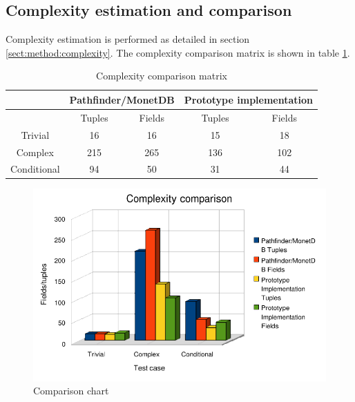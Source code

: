 \newpage
\subsection{Complexity estimation and comparison}
Complexity estimation is performed as detailed in section
\ref{sect:method:complexity}. The complexity
comparison matrix is shown in table \ref{table:result:complexity_matrix}.

\begin{table}[!htp]
 \begin{tabular}{| c | c | c || c | c |}
  \hline
   & \multicolumn{2}{|c||}{\textbf{Pathfinder/MonetDB}}
   & \multicolumn{2}{|c|}{\textbf{Prototype implementation}} \\
   \hline
   & Tuples & Fields & Tuples & Fields \\  
   \hline   
   Trivial & 16 & 16 & 15 & 18 \\  
   \hline
   Complex & 215 & 265 & 136 & 102 \\
   \hline
   Conditional & 94 & 50 & 31 & 44 \\  
   \hline
 \end{tabular}
\caption{Complexity comparison matrix}
\label{table:result:complexity_matrix}
\end{table}

\begin{figure}[!htp]
\begin{center}
  \includegraphics[width=1.0\textwidth]{diagrams/comparison_chart}
  \caption{Comparison chart}
  \label{fig:results:comparison:chart}
\end{center}
\end{figure}